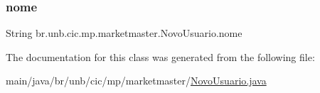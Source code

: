 \subsubsection{\texorpdfstring{nome}{nome}}
{\footnotesize\ttfamily String br.\+unb.\+cic.\+mp.\+marketmaster.\+Novo\+Usuario.\+nome\hspace{0.3cm}{\ttfamily [private]}}



The documentation for this class was generated from the following file\+:\begin{DoxyCompactItemize}
\item 
main/java/br/unb/cic/mp/marketmaster/\mbox{\hyperlink{NovoUsuario_8java}{Novo\+Usuario.\+java}}\end{DoxyCompactItemize}
